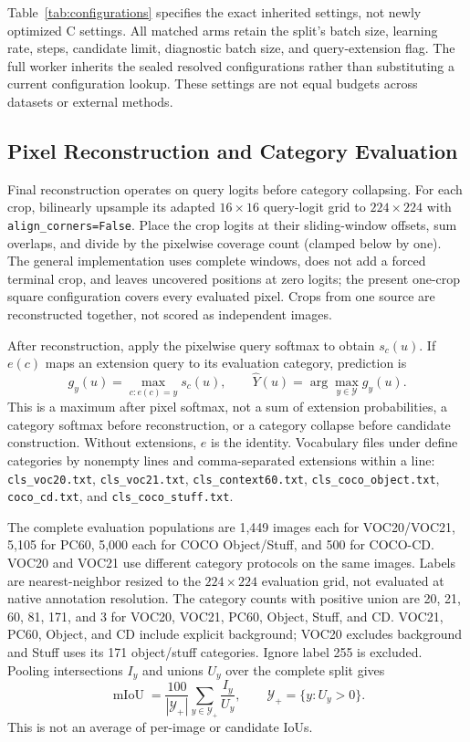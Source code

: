 

Table~\ref{tab:configurations} specifies the exact inherited settings, not newly optimized C settings. All matched arms retain the split's batch size, learning rate, steps, candidate limit, diagnostic batch size, and query-extension flag. The full worker inherits the sealed resolved configurations rather than substituting a current configuration lookup. These settings are not equal budgets across datasets or external methods.

\subsection{Pixel Reconstruction and Category Evaluation}
Final reconstruction operates on query logits before category collapsing. For each crop, bilinearly upsample its adapted $16\times16$ query-logit grid to $224\times224$ with \texttt{align\_corners=False}. Place the crop logits at their sliding-window offsets, sum overlaps, and divide by the pixelwise coverage count (clamped below by one). The general implementation uses complete windows, does not add a forced terminal crop, and leaves uncovered positions at zero logits; the present one-crop square configuration covers every evaluated pixel. Crops from one source are reconstructed together, not scored as independent images.

After reconstruction, apply the pixelwise query softmax to obtain $s_c(u)$. If $e(c)$ maps an extension query to its evaluation category, prediction is
\begin{equation}
g_y(u)=\max_{c:e(c)=y}s_c(u),\qquad
\widehat Y(u)=\arg\max_{y\in\mathcal Y}g_y(u).
\end{equation}
This is a maximum after pixel softmax, not a sum of extension probabilities, a category softmax before reconstruction, or a category collapse before candidate construction. Without extensions, $e$ is the identity. Vocabulary files under  define categories by nonempty lines and comma-separated extensions within a line: \texttt{cls\_voc20.txt}, \texttt{cls\_voc21.txt}, \texttt{cls\_context60.txt}, \texttt{cls\_coco\_object.txt}, \texttt{coco\_cd.txt}, and \texttt{cls\_coco\_stuff.txt}.

The complete evaluation populations are 1,449 images each for VOC20/VOC21, 5,105 for PC60, 5,000 each for COCO Object/Stuff, and 500 for COCO-CD. VOC20 and VOC21 use different category protocols on the same images. Labels are nearest-neighbor resized to the $224\times224$ evaluation grid, not evaluated at native annotation resolution. The category counts with positive union are 20, 21, 60, 81, 171, and 3 for VOC20, VOC21, PC60, Object, Stuff, and CD. VOC21, PC60, Object, and CD include explicit background; VOC20 excludes background and Stuff uses its 171 object/stuff categories. Ignore label 255 is excluded. Pooling intersections $I_y$ and unions $U_y$ over the complete split gives
\begin{equation}
\operatorname{mIoU}=\frac{100}{|\mathcal Y_+|}
\sum_{y\in\mathcal Y_+}\frac{I_y}{U_y},
\qquad \mathcal Y_+=\{y:U_y>0\}.
\end{equation}
This is not an average of per-image or candidate IoUs.

